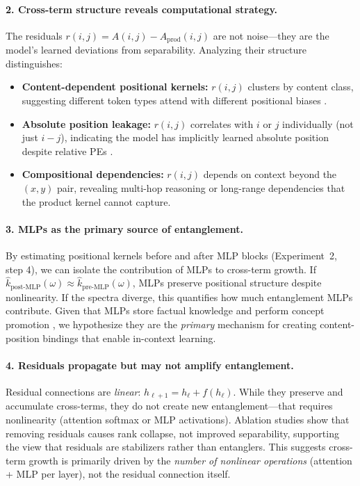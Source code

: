 \documentclass[11pt]{article}
\theoremstyle{definition}
\begin{document}
\paragraph{2. Cross-term structure reveals computational strategy.}
The residuals $r(i,j) = A(i,j) - A_{\text{prod}}(i,j)$ are not noise---they are the model's learned deviations from separability. Analyzing their structure distinguishes:
\begin{itemize}
    \item \textbf{Content-dependent positional kernels:} $r(i,j)$ clusters by content class, suggesting different token types attend with different positional biases \cite{voita2019headpruning}.
    \item \textbf{Absolute position leakage:} $r(i,j)$ correlates with $i$ or $j$ individually (not just $i-j$), indicating the model has implicitly learned absolute position despite relative PEs \cite{haviv2022nopos}.
    \item \textbf{Compositional dependencies:} $r(i,j)$ depends on context beyond the $(x,y)$ pair, revealing multi-hop reasoning or long-range dependencies that the product kernel cannot capture.
\end{itemize}

\paragraph{3. MLPs as the primary source of entanglement.}
By estimating positional kernels before and after MLP blocks (Experiment~2, step 4), we can isolate the contribution of MLPs to cross-term growth. If $\hat{k}_{\text{post-MLP}}(\omega) \approx \hat{k}_{\text{pre-MLP}}(\omega)$, MLPs preserve positional structure despite nonlinearity. If the spectra diverge, this quantifies how much entanglement MLPs contribute. Given that MLPs store factual knowledge \cite{geva2021mlp} and perform concept promotion \cite{dar2023analyzing}, we hypothesize they are the \emph{primary} mechanism for creating content-position bindings that enable in-context learning.

\paragraph{4. Residuals propagate but may not amplify entanglement.}
Residual connections are \emph{linear}: $h_{\ell+1} = h_\ell + f(h_\ell)$. While they preserve and accumulate cross-terms, they do not create new entanglement---that requires nonlinearity (attention softmax or MLP activations). Ablation studies \cite{dong2021attention} show that removing residuals causes rank collapse, not improved separability, supporting the view that residuals are stabilizers rather than entanglers. This suggests cross-term growth is primarily driven by the \emph{number of nonlinear operations} (attention + MLP per layer), not the residual connection itself.
\end{document}
